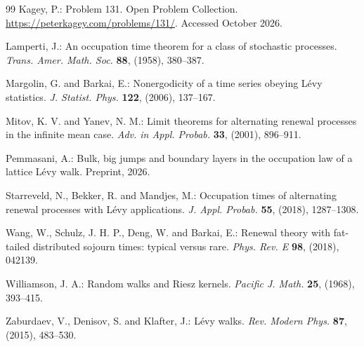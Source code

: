 \begin{thebibliography}{99}
 Kagey, P.: Problem 131. Open Problem Collection.
  \url{https://peterkagey.com/problems/131/}. Accessed October 2026.

 Lamperti, J.: An occupation time theorem for a class of
  stochastic processes. \emph{Trans. Amer. Math. Soc.} \textbf{88}, (1958),
  380--387. 

 Margolin, G. and Barkai, E.: Nonergodicity of a
  time series obeying L\'evy statistics. \emph{J. Statist. Phys.} \textbf{122},
  (2006), 137--167. 

 Mitov, K. V. and Yanev, N. M.: Limit theorems for
  alternating renewal processes in the infinite mean case. \emph{Adv. in Appl.
  Probab.} \textbf{33}, (2001), 896--911.

 Pemmasani, A.: Bulk, big jumps and boundary layers in the
  occupation law of a lattice L\'evy walk. Preprint, 2026.

 Starreveld, N., Bekker, R. and Mandjes, M.: Occupation times
  of alternating renewal processes with L\'evy applications. \emph{J. Appl.
  Probab.} \textbf{55}, (2018), 1287--1308. 

 Wang, W., Schulz, J. H. P., Deng, W. and Barkai, E.:
  Renewal theory with fat-tailed distributed sojourn times: typical versus
  rare. \emph{Phys. Rev. E} \textbf{98}, (2018), 042139. 

 Williamson, J. A.: Random walks and Riesz kernels.
  \emph{Pacific J. Math.} \textbf{25}, (1968), 393--415.

 Zaburdaev, V., Denisov, S. and Klafter, J.: L\'evy walks.
  \emph{Rev. Modern Phys.} \textbf{87}, (2015), 483--530. 

\end{thebibliography}
